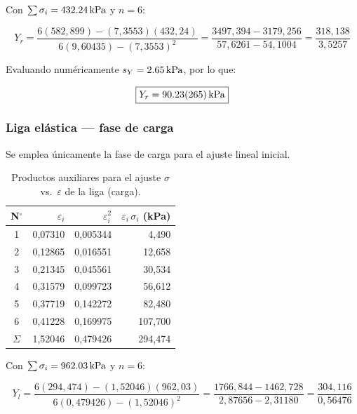 Con $\sum\sigma_{i} = \qty{432{,}24}{kPa}$ y $n = 6$:

\begin{equation*}
    Y_r = \frac{6(582{,}899) - (7{,}3553)(432{,}24)}
               {6(9{,}60435) - (7{,}3553)^2}
        = \frac{3497{,}394 - 3179{,}256}
               {57{,}6261 - 54{,}1004}
        = \frac{318{,}138}{3{,}5257}
\end{equation*}

Evaluando numéricamente $s_Y = \qty{2{,}65}{kPa}$,
por lo que:

\begin{equation}
    \boxed{Y_r = \qty{90{,}23 \pm 2{,}65}{kPa}}
    \label{eq:Young_resorte}
\end{equation}

\subsubsection{Liga elástica — fase de carga}

Se emplea únicamente la fase de carga para el ajuste lineal inicial.

\begin{table}[H]
    \centering
    \caption{Productos auxiliares para el ajuste $\sigma$ vs.\ $\varepsilon$
             de la liga (carga).}
    \label{tab:sumas_young_liga}
    \begin{tabular}{crrr}
        \toprule
        \textbf{N$^{\circ}$}
            & \textbf{$\varepsilon_i$}
            & \textbf{$\varepsilon_i^2$}
            & \textbf{$\varepsilon_i\,\sigma_i$ (kPa)} \\
        \midrule
        1 & 0{,}07310 & 0{,}005344 &   4{,}490 \\
        2 & 0{,}12865 & 0{,}016551 &  12{,}658 \\
        3 & 0{,}21345 & 0{,}045561 &  30{,}534 \\
        4 & 0{,}31579 & 0{,}099723 &  56{,}612 \\
        5 & 0{,}37719 & 0{,}142272 &  82{,}480 \\
        6 & 0{,}41228 & 0{,}169975 & 107{,}700 \\
        \midrule
        $\Sigma$ & 1{,}52046 & 0{,}479426 & 294{,}474 \\
        \bottomrule
    \end{tabular}
\end{table}

Con $\sum\sigma_i = \qty{962{,}03}{kPa}$ y $n = 6$:

\begin{equation*}
    Y_l = \frac{6(294{,}474) - (1{,}52046)(962{,}03)}
               {6(0{,}479426) - (1{,}52046)^2}
        = \frac{1766{,}844 - 1462{,}728}
               {2{,}87656 - 2{,}31180}
        = \frac{304{,}116}{0{,}56476}
\end{equation*}

